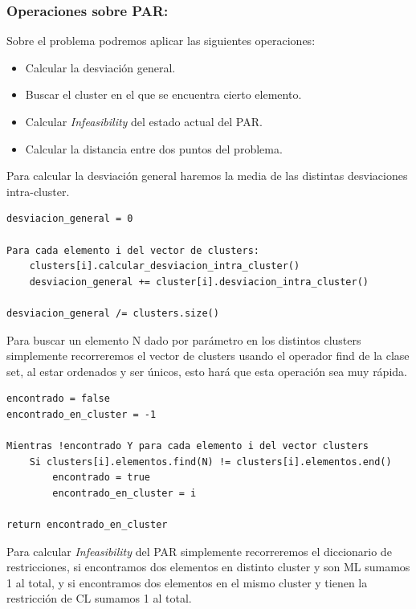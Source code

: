 \documentclass[12pt, spanish]{article}
\begin{document}
\newpage

\subsubsection{Operaciones sobre PAR:}

Sobre el problema podremos aplicar las siguientes operaciones:

\begin{itemize}
	\item {Calcular la desviación general.}
	\item {Buscar el cluster en el que se encuentra cierto elemento.}
	\item {Calcular \textit{Infeasibility} del estado actual del PAR.}
	\item {Calcular la distancia entre dos puntos del problema.}
\end{itemize}

Para calcular la desviación general haremos la media de las distintas desviaciones intra-cluster.


\begin{lstlisting}
desviacion_general = 0

Para cada elemento i del vector de clusters:
	clusters[i].calcular_desviacion_intra_cluster()
	desviacion_general += cluster[i].desviacion_intra_cluster()

desviacion_general /= clusters.size()

\end{lstlisting}

Para buscar un elemento N dado por parámetro en los distintos clusters simplemente recorreremos el vector de clusters usando el operador find de la clase set, al estar ordenados y ser únicos, esto hará que esta operación sea muy rápida.

\begin{lstlisting}
encontrado = false
encontrado_en_cluster = -1

Mientras !encontrado Y para cada elemento i del vector clusters
	Si clusters[i].elementos.find(N) != clusters[i].elementos.end()
		encontrado = true
		encontrado_en_cluster = i

return encontrado_en_cluster

\end{lstlisting}


Para calcular  \textit{Infeasibility} del PAR simplemente recorreremos el diccionario de restricciones, si encontramos dos elementos en distinto cluster y son ML sumamos 1 al total, y si encontramos dos elementos en el mismo cluster y tienen la restricción de CL sumamos 1 al total.
\end{document}
